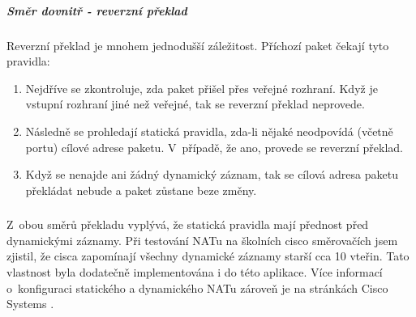 


\subparagraph{Směr dovnitř - reverzní překlad}

Reverzní překlad je mnohem jednodušší záležitost. Příchozí paket čekají tyto pravidla:
\begin{enumerate}
  \item Nejdříve se zkontroluje, zda paket přišel přes veřejné rozhraní. Když je vstupní rozhraní jiné než veřejné, tak se reverzní překlad neprovede.

  \item Následně se prohledají statická pravidla, zda-li nějaké neodpovídá (včetně portu) cílové adrese paketu. V~případě, že ano, provede se reverzní překlad.

  \item Když se nenajde ani žádný dynamický záznam, tak se cílová adresa paketu překládat nebude a paket zůstane beze změny.
\end{enumerate}


\subsubsection*{}
Z~obou směrů překladu vyplývá, že statická pravidla mají přednost před dynamickými záznamy. Při testování NATu na školních cisco směrovačích jsem zjistil, že cisca zapomínají všechny dynamické záznamy starší cca 10 vteřin. Tato vlastnost byla dodatečně implementována i do této aplikace. Více informací o~konfiguraci statického a dynamického NATu zároveň je na stránkách Cisco Systems \cite{cisco:snat_dnat}.









